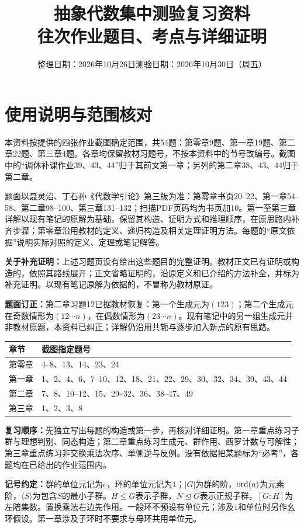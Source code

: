 \documentclass[UTF8,a4paper,11pt,fontset=windows]{ctexart}
\title{抽象代数集中测验复习资料\\\large 往次作业题目、考点与详细证明}
\author{}\date{整理日期：2026年10月26日\quad 测验日期：2026年10月30日（周五）}
\theoremstyle{definition}
\begin{document}
\maketitle
\section*{使用说明与范围核对}
本资料按提供的四张作业截图确定范围，共54题：第零章9题、第一章19题、第二章22题、第三章4题。各章均保留教材习题号，不按本资料中的节号改编号。截图中的“调休补课作业39、43、44”归于其前文第一章；另列的第二章38、43、44归于第二章。

题面以聂灵沼、丁石孙《代数学引论》第三版为准：第零章书页20--22、第一章54--58、第二章98--100、第三章131--132；扫描PDF页码均为书页加10。第一至第三章详解以现有笔记的原解为基础，保留其构造、证明方式和推理顺序，在原思路内补齐步骤；第零章沿用教材的定义、递归构造及相关定理证明方法。每题的“原文依据”说明实际对照的定义、定理或笔记解答。

\textbf{关于补充证明：}上述习题页没有给出这些题目的完整证明。教材正文已有证明或构造的，依照其路线展开；正文省略证明的，沿原定义和已介绍的方法补全，并标为补充证明。以现有笔记原解为依据的，不冒称为教材原证。

\textbf{题面订正：}第二章习题12已据教材恢复：第一个生成元为$(123)$；第二个生成元在奇数情形为$(12\cdots n)$，在偶数情形为$(23\cdots n)$。现有笔记中的另一组生成元并非教材原题，本资料已纠正；详解仍沿用共轭与逐步加入新点的原有思路。

\begin{center}\small
\begin{tabular}{p{1.6cm}p{11.6cm}}
\toprule 章节 & 截图指定题号\\\midrule
第零章 & 4--8、13、14、23、24\\
第一章 & 1、2、4、6、7--10、12、18、21、22、29、30、32、34、39、43、44\\
第二章 & 7、8、10--12、15、29--32、36、38--47、49\\
第三章 & 1、2、3、8\\\bottomrule
\end{tabular}
\end{center}

\textbf{复习顺序：}先独立写出每题的构造或第一步，再核对详细证明。第一章重点练习子群与理想判别、同态构造；第二章重点练习生成元、群作用、西罗计数与可解性；第三章重点练习非交换乘法次序、单侧逆与反例。没有依据把某题标为“必考”，各题均在已给出的作业范围内。

\textbf{记号约定：}群的单位元记为$e$，环的单位元记为$1$；$|G|$为群的阶，$\operatorname{ord}(a)$为元素阶，$\langle S\rangle$为包含$S$的最小子群。$H\leq G$表示子群，$N\trianglelefteq G$表示正规子群，$[G:H]$为左陪集数。置换乘法右边先作用。一般环不预设有单位元；涉及$1$和单位时另作幺环假设。第一章涉及子环时不要求与母环共用单位元。
\end{document}
